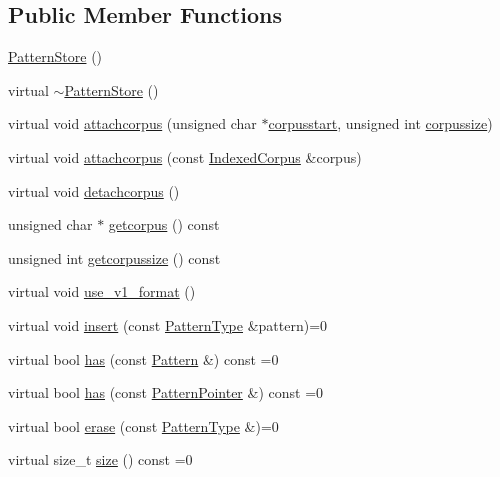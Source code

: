 \subsection*{Public Member Functions}
\begin{DoxyCompactItemize}
\item 
\hyperlink{classPatternStore_a8fc2f93bbac98093e3928423a9ef2fb6}{Pattern\+Store} ()
\item 
virtual \hyperlink{classPatternStore_ac4a1446d8c1637e34147dab4655e1bf1}{$\sim$\+Pattern\+Store} ()
\item 
virtual void \hyperlink{classPatternStore_a6e4361163bb2568593a5049f214a17b5}{attachcorpus} (unsigned char $\ast$\hyperlink{classPatternStore_a56811e603e5a5ce165a8709216f3f1c5}{corpusstart}, unsigned int \hyperlink{classPatternStore_aae8c0f162986134d629b0e6b1a63b4cc}{corpussize})
\item 
virtual void \hyperlink{classPatternStore_a38c362e35c48cf8a29b9a91bc9545cd3}{attachcorpus} (const \hyperlink{classIndexedCorpus}{Indexed\+Corpus} \&corpus)
\item 
virtual void \hyperlink{classPatternStore_a07493b7e476f3d59539ac7be0c811412}{detachcorpus} ()
\item 
unsigned char $\ast$ \hyperlink{classPatternStore_a53c9f6c2ef894c4ea871471d6b259d55}{getcorpus} () const 
\item 
unsigned int \hyperlink{classPatternStore_a409a492f79640da8eef56b089504191d}{getcorpussize} () const 
\item 
virtual void \hyperlink{classPatternStore_af82a73cc05a22318f86daee0e4ae5189}{use\+\_\+v1\+\_\+format} ()
\item 
virtual void \hyperlink{classPatternStore_aac1558cd3f7e4ec8ec142e1c59f122c9}{insert} (const \hyperlink{pattern_8h_a351dc5aa88481a949638aeb6cc5e6754}{Pattern\+Type} \&pattern)=0
\item 
virtual bool \hyperlink{classPatternStore_a2e29add9b35b3459d183f56f6c5525ed}{has} (const \hyperlink{classPattern}{Pattern} \&) const  =0
\item 
virtual bool \hyperlink{classPatternStore_ad1e06c2468bad2a14d4ed28b26c6ff33}{has} (const \hyperlink{classPatternPointer}{Pattern\+Pointer} \&) const  =0
\item 
virtual bool \hyperlink{classPatternStore_a42f8de80a8627c485315e4bb8eff538f}{erase} (const \hyperlink{pattern_8h_a351dc5aa88481a949638aeb6cc5e6754}{Pattern\+Type} \&)=0
\item 
virtual size\+\_\+t \hyperlink{classPatternStore_abfa82df94ab565bea13fc45ee4866faf}{size} () const  =0

\end{DoxyCompactItemize}
